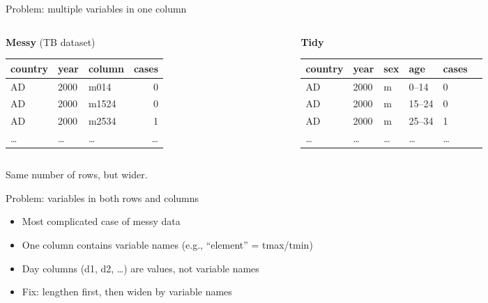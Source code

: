 \begin{frame}{Problem: multiple variables in one column}
  \begin{columns}[T]
    \begin{column}{0.48\textwidth}
      \textbf{Messy} (TB dataset)\\[0.2cm]
      \centering\scriptsize
      \begin{tabular}{lllr}
        \toprule
        \textbf{country} & \textbf{year} & \textbf{column} & \textbf{cases} \\
        \midrule
        AD & 2000 & m014 & 0 \\
        AD & 2000 & m1524 & 0 \\
        AD & 2000 & m2534 & 1 \\
        \dots & \dots & \dots & \dots \\
        \bottomrule
      \end{tabular}
    \end{column}
    \begin{column}{0.48\textwidth}
      \textbf{Tidy}\\[0.2cm]
      \centering\scriptsize
      \begin{tabular}{lllllr}
        \toprule
        \textbf{country} & \textbf{year} & \textbf{sex} & \textbf{age} & \textbf{cases} \\
        \midrule
        AD & 2000 & m & 0--14 & 0 \\
        AD & 2000 & m & 15--24 & 0 \\
        AD & 2000 & m & 25--34 & 1 \\
        \dots & \dots & \dots & \dots & \dots \\
        \bottomrule
      \end{tabular}
    \end{column}
  \end{columns}

  \vspace{0.3cm}
  Same number of rows, but wider.
\end{frame}

\begin{frame}{Problem: variables in both rows and columns}
  \begin{itemize}
    \item Most complicated case of messy data
    \item One column contains variable names (e.g., ``element'' = tmax/tmin)
    \item Day columns (d1, d2, \ldots) are values, not variable names
    \item Fix: lengthen first, then widen by variable names
  \end{itemize}
\end{frame}

